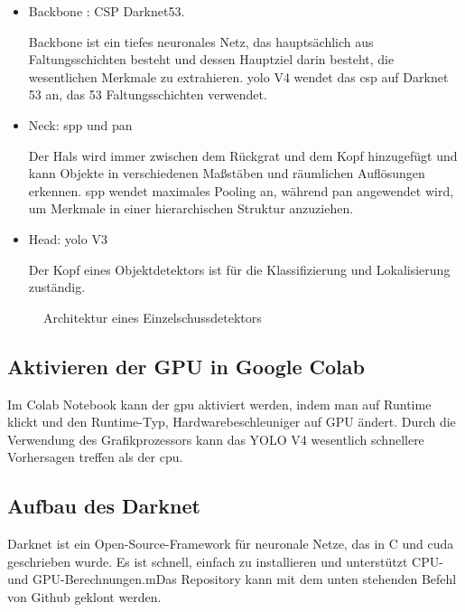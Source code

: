 \begin{itemize}
  \item Backbone : CSP Darknet53.

	    Backbone ist ein tiefes neuronales Netz, das hauptsächlich aus Faltungsschichten besteht und dessen Hauptziel darin besteht, die wesentlichen Merkmale zu extrahieren. \ac{yolo} V4 wendet das \ac{csp} auf Darknet 53 an, das 53 Faltungsschichten verwendet.

  \item Neck: \ac{spp} und \ac{pan}

        Der Hals wird immer zwischen dem Rückgrat und dem Kopf hinzugefügt und kann Objekte in verschiedenen Maßstäben und räumlichen Auflösungen erkennen. \ac{spp} wendet maximales Pooling an, während \ac{pan} angewendet wird, um Merkmale in einer hierarchischen Struktur anzuziehen.

  \item Head: \ac{yolo} V3

        Der Kopf eines Objektdetektors ist für die Klassifizierung und Lokalisierung zuständig.
\end{itemize}

\begin{figure}[H]
	\centering
	\caption{Architektur eines Einzelschussdetektors \cite{Bochkovskiy:2020}}
	\label{ColabOneShot}
\end{figure}

\subsection{Aktivieren der GPU in Google Colab}

Im Colab Notebook kann der \ac{gpu} aktiviert werden, indem man auf Runtime klickt und den Runtime-Typ, Hardwarebeschleuniger auf GPU ändert. Durch die Verwendung des Grafikprozessors kann das YOLO V4 wesentlich schnellere Vorhersagen treffen als der \ac{cpu}. 

\subsection{Aufbau des Darknet}

Darknet ist ein Open-Source-Framework für neuronale Netze, das in C und \ac{cuda} geschrieben wurde. \cite{Bochkovskiy:2020} Es ist schnell, einfach zu installieren und unterstützt CPU- und GPU-Berechnungen.mDas Repository kann mit dem unten stehenden Befehl von Github geklont werden.

